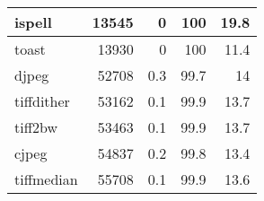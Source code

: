 \begin{tabular}{|l|r|r|r|r|}
\hline
 ispell          &   13545 &    0   &        100   &    19.8 \\
\hline
 toast           &   13930 &    0   &        100   &    11.4 \\
\hline
 djpeg           &   52708 &    0.3 &         99.7 &    14   \\
\hline
 tiffdither      &   53162 &    0.1 &         99.9 &    13.7 \\
\hline
 tiff2bw         &   53463 &    0.1 &         99.9 &    13.7 \\
\hline
 cjpeg           &   54837 &    0.2 &         99.8 &    13.4 \\
\hline
 tiffmedian      &   55708 &    0.1 &         99.9 &    13.6 \\
\hline
\end{tabular}

